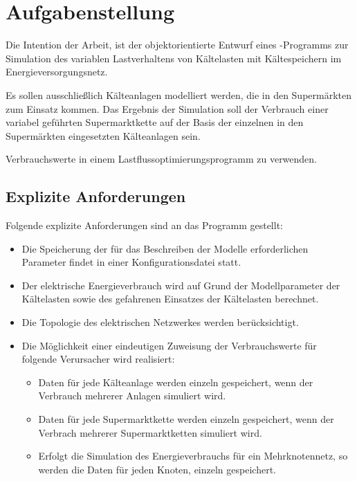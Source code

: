 \chapter{Aufgabenstellung}
\label{chap:aufst}


Die Intention der Arbeit, ist der objektorientierte Entwurf eines
\matlab-Programms zur Simulation des variablen Lastverhaltens von Kältelasten
mit Kältespeichern im Energieversorgungsnetz. 

Es sollen ausschlie\ss lich K\"alteanlagen modelliert werden, die in den
Superm\"arkten zum Einsatz kommen. Das Ergebnis der Simulation soll der
Verbrauch einer variabel gef\"uhrten Supermarktkette auf der Basis der einzelnen
in den Superm\"arkten eingesetzten K\"alteanlagen sein.

Verbrauchswerte in einem Lastflussoptimierungsprogramm zu verwenden.

\section*{Explizite Anforderungen}

Folgende explizite Anforderungen sind an das Programm gestellt:

\begin{itemize}
	\item Die Speicherung der f\"ur das Beschreiben der Modelle
	erforderlichen Parameter findet in einer Konfigurationsdatei statt.
	\item Der elektrische Energieverbrauch wird auf Grund der
	Modellparameter der Kältelasten sowie des gefahrenen Einsatzes der
	Kältelasten berechnet.
	\item Die Topologie des elektrischen Netzwerkes werden ber\"ucksichtigt.
	\item Die M\"oglichkeit einer eindeutigen Zuweisung der Verbrauchswerte
	f\"ur folgende Verursacher wird realisiert:
	\begin{itemize}
		\item Daten f\"ur jede K\"alteanlage werden einzeln gespeichert,
		wenn der Verbrauch mehrerer Anlagen simuliert wird.
		\item Daten f\"ur jede Supermarktkette werden einzeln
		gespeichert, wenn der Verbrach mehrerer Supermarktketten
		simuliert wird.
		\item Erfolgt die Simulation des Energieverbrauchs f\"ur ein
		Mehrknotennetz, so werden die Daten f\"ur jeden Knoten, einzeln
		gespeichert.
	\end{itemize}
\end{itemize}


